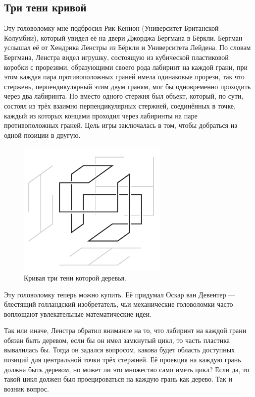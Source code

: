 \subsection*{Три тени кривой}

Эту головоломку мне подбросил Рик Кенион (Университет Британской Колумбии), который увидел её на двери Джорджа Бергмана в Бёркли. 
Бергман услышал её от Хендрика Ленстры из Бёркли и Университета Лейдена.
По словам Бергмана, Ленстра видел игрушку, состоящую из кубической пластиковой коробки с прорезями, образующими своего рода лабиринт на каждой грани, при этом каждая пара противоположных граней имела одинаковые прорези, так что стержень, перпендикулярный этим двум граням, мог бы одновременно проходить через два лабиринта.
Но вместо одного стержня был объект, который, по сути, состоял из трёх взаимно перпендикулярных стержней, соединённых в точке, каждый из которых концами проходил через лабиринты на паре противоположных граней.
Цель игры заключалась в том, чтобы добраться из одной позиции в другую.

\begin{figure}[htb!]
\centering
\includegraphics[scale=1]{pics/tree3}
\caption{Кривая три тени которой деревья.}
\label{pic:tree3}
\end{figure}

Эту головоломку теперь можно купить.
Её придумал Оскар ван Девентер --- блестящий голландский изобретатель, чьи механические головоломки часто воплощают увлекательные математические идеи.

Так или иначе, Ленстра обратил внимание на то, что лабиринт на каждой грани обязан быть деревом,
если бы он имел замкнутый цикл, то часть пластика вывалилась бы.
Тогда он задался вопросом, какова будет область доступных позиций для центральной точки трёх стержней.
Её проекция на каждую грань должна быть деревом, но может ли это множество само иметь цикл?
Если да, то такой цикл должен был проецироваться на каждую грань как дерево.
Так и возник вопрос.

